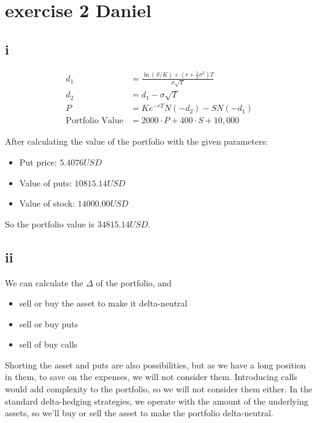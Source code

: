 \documentclass{article}
\begin{document}
\section{exercise 2 Daniel}
\subsection{i}


\begin{align*}
    d_1                    & = \frac{\ln(S/K) + \left(r + \frac{1}{2} \sigma^2\right) T}{\sigma \sqrt{T}} \\
    d_2                    & = d_1 - \sigma \sqrt{T}                                                      \\
    P                      & = K e^{-rT} N(-d_2) - S N(-d_1)                                              \\
    \text{Portfolio Value} & = 2000 \cdot P + 400 \cdot S + 10,\!000
\end{align*}

After calculating the value of the portfolio with the given parameters:
\begin{itemize}
    \item Put price: $5.4076USD$
    \item Value of puts: $10815.14USD$
    \item Value of stock: $14000.00USD$
\end{itemize}

So the portfolio value is $34815.14USD$.

\subsection{ii}
We can calculate the $\Delta$ of the portfolio, and
\begin{itemize}
    \item sell or buy the asset to make it delta-neutral
    \item sell or buy puts
    \item sell of buy calls
\end{itemize}
Shorting the asset and puts are also possibilities, but as we have a long position in them, to save on the expenses,
we will not consider them. Introducing calls would add complexity to the portfolio,
so we will not consider them either. In the standard delta-hedging strategies,
we operate with the amount of the underlying assets, so we'll buy or sell the asset to make the portfolio delta-neutral.
\end{document}
